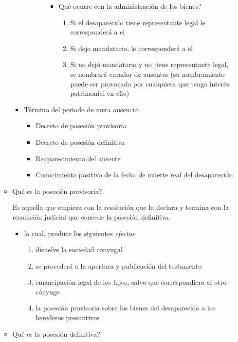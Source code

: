 \documentclass[]{article}
\providecommand{\tightlist}{%
  \setlength{\itemsep}{0pt}\setlength{\parskip}{0pt}}
\begin{document}
\begin{itemize}
\begin{itemize}
\begin{itemize}
\begin{itemize}
\begin{itemize}
          \begin{itemize}
          \tightlist
          \item
            Qué ocurre con la administración de los bienes?

            \begin{enumerate}
            \def\labelenumi{\arabic{enumi}.}
            \tightlist
            \item
              Si el desaparecido tiene representante legal le
              corresponderá a el
            \item
              Si dejo mandatario, le corresponderá a el
            \item
              Si no dejó mandatario y no tiene representante legal, se
              nombrará curador de ausentes (su nombramiento puede ser
              provocado por cualquiera que tenga interés patrimonial en
              ello)
            \end{enumerate}
          \end{itemize}
        \end{itemize}
      \end{itemize}
    \item
      Término del periodo de mera ausencia:

      \begin{itemize}
      \tightlist
      \item
        Decreto de posesión provisoria
      \item
        Decreto de posesión definitiva
      \item
        Reaparecimiento del ausente
      \item
        Conocimiento positivo de la fecha de muerte real del
        desaparecido.
      \end{itemize}
    \end{itemize}
  \item
    Qué es la posesión provisoria?

    Es aquella que empieza con la resolución que la declara y termina
    con la resolución judicial que concede la posesión definitiva.

    \begin{itemize}
    \item
      la cual, produce los siguientes \emph{efectos}

      \begin{enumerate}
      \def\labelenumi{\arabic{enumi}.}
      \item
        disuelve la sociedad conyugal
      \item
        se procederá a la apertura y publicación del testamento
      \item
        emancipación legal de los hijos, salvo que correspondiera al
        otro cónyuge
      \item
        la posesión provisoria sobre los bienes del desaparecido a los
        herederos presuntivos
      \end{enumerate}
    \end{itemize}
  \item
    Qué es la posesión definitiva?


\end{itemize}
\end{itemize}
\end{document}
